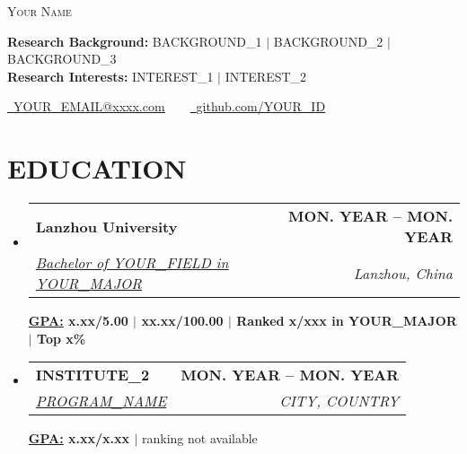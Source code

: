 \documentclass[letterpaper,11pt]{article}
\makeatletter
\newcommand{\resumeSubheading}[4]{
  \vspace{-2pt}\item
    \begin{tabular*}{1.0\textwidth}[t]{l@{\extracolsep{\fill}}r}
      \textbf{#1} & \textbf{\small #2} \\
      \textit{\small#3} & \textit{\small #4} \\
    \end{tabular*}\vspace{-7pt}
}
\newcommand{\resumeSubHeadingListStart}{\begin{itemize}[leftmargin=0.0in, label={}]}
\newcommand{\resumeSubHeadingListEnd}{\end{itemize}}
\makeatother
\begin{document}
\begin{center}
    {\Huge \scshape Your Name} \\ \vspace{1pt}

    \textbf{Research Background:} BACKGROUND\_1 $\vert$ BACKGROUND\_2 $\vert$ BACKGROUND\_3 \\ \vspace{1pt}
    \textbf{Research Interests:} INTEREST\_1 $\vert$ INTEREST\_2\\ \vspace{2pt}

    \small  \href{mailto:YOUR_EMAIL@xxxx.com}{\raisebox{-0.2\height}\faEnvelope\  \underline{YOUR\_EMAIL@xxxx.com}} ~ ~
    \href{https://github.com/YOUR_ID}{\raisebox{-0.2\height}\faGithub\ \underline{github.com/YOUR\_ID}}
    \vspace{-8pt}
\end{center}


\section{EDUCATION}
  \resumeSubHeadingListStart
    \resumeSubheading
      {Lanzhou University}{MON. YEAR -- MON. YEAR}
      {\underline{Bachelor of YOUR\_FIELD in YOUR\_MAJOR}}{Lanzhou, China}
      \vspace{2pt}
      {\small {\newline{}\textbf{\underline{GPA:} x.xx/5.00 $\vert$ xx.xx/100.00 $\vert$ Ranked x/xxx in YOUR\_MAJOR $\vert$ Top x\%}}}
      \vspace{-1pt}

    \resumeSubheading
      {INSTITUTE\_2}{MON. YEAR -- MON. YEAR}
      {\underline{PROGRAM\_NAME}}{CITY, COUNTRY}
      \vspace{2pt}
      {\small {\newline{}\textbf{\underline{GPA:} x.xx/x.xx $\vert$} ranking not available}}
      \vspace{-1pt}
  \resumeSubHeadingListEnd
\end{document}

